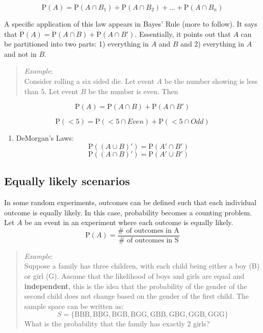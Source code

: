 \documentclass[
  letterpaper,
  DIV=11,
  numbers=noendperiod]{scrreprt}
\providecommand{\tightlist}{%
  \setlength{\itemsep}{0pt}\setlength{\parskip}{0pt}}\usepackage{longtable,booktabs,array}
\begin{document}
\[
\mbox{P}(A)=\mbox{P}(A\cap B_1)+\mbox{P}(A\cap B_2)+...+\mbox{P}(A\cap B_n)
\]

A specific application of this law appears in Bayes' Rule (more to
follow). It says that
\(\mbox{P}(A)=\mbox{P}(A \cap B)+\mbox{P}(A \cap B')\). Essentially, it
points out that \(A\) can be partitioned into two parts: 1) everything
in \(A\) and \(B\) and 2) everything in \(A\) and not in \(B\).

\begin{quote}
\emph{Example}:\\
Consider rolling a six sided die. Let event \(A\) be the number showing
is less than 5. Let event \(B\) be the number is even. Then
\end{quote}

\[\mbox{P}(A)=\mbox{P}(A \cap B) + \mbox{P}(A \cap B')\]

\[
\mbox{P}(< 5)=\mbox{P}(<5 \cap Even)+\mbox{P}(<5 \cap Odd)
\]

\begin{enumerate}
\def\labelenumi{\arabic{enumi})}
\setcounter{enumi}{5}
\tightlist
\item
  DeMorgan's Laws: \[
  \mbox{P}((A \cup B)')=\mbox{P}(A' \cap B')
  \] \[
  \mbox{P}((A \cap B)')=\mbox{P}(A' \cup B')
  \]
\end{enumerate}

\subsection{Equally likely scenarios}\label{equally-likely-scenarios}

In some random experiments, outcomes can be defined such that each
individual outcome is equally likely. In this case, probability becomes
a counting problem. Let \(A\) be an event in an experiment where each
outcome is equally likely. \[
\mbox{P}(A)=\frac{\mbox{# of outcomes in A}}{\mbox{# of outcomes in S}}
\]

\begin{quote}
\emph{Example}:\\
Suppose a family has three children, with each child being either a boy
(B) or girl (G). Assume that the likelihood of boys and girls are equal
and \textbf{independent}, this is the idea that the probability of the
gender of the second child does not change based on the gender of the
first child. The sample space can be written as: \[
S=\{\mbox{BBB},\mbox{BBG},\mbox{BGB},\mbox{BGG},\mbox{GBB},\mbox{GBG},\mbox{GGB},\mbox{GGG}\}
\] What is the probability that the family has exactly 2 girls?
\end{quote}
\end{document}

